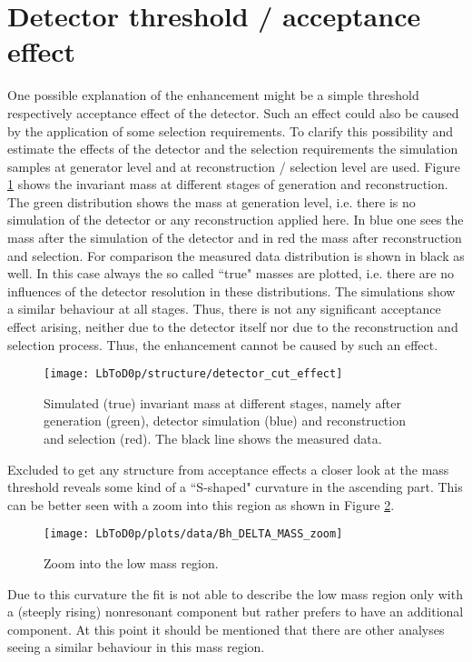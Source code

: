 \section{Detector threshold / acceptance effect}
One possible explanation of the enhancement might be a simple threshold respectively acceptance effect of the detector.
Such an effect could also be caused by the application of some selection requirements.
To clarify this possibility and estimate the effects of the detector and the selection requirements the simulation samples at generator level and at reconstruction / selection level are used.
Figure \ref{fig:detector_cut_effect} shows the invariant \Dz\proton mass at different stages of generation and reconstruction.
The green distribution shows the \Dz\proton mass at generation level, i.e. there is no simulation of the detector or any reconstruction applied here.
In blue one sees the \Dz\proton mass after the simulation of the detector and in red the mass after reconstruction and selection.
For comparison the measured data distribution is shown in black as well.
In this case always the so called ``true" masses are plotted, i.e. there are no influences of the detector resolution in these distributions.
The simulations show a similar behaviour at all stages.
Thus, there is not any significant acceptance effect arising, neither due to the detector itself nor due to the reconstruction and selection process. 
Thus, the enhancement cannot be caused by such an effect.
\begin{figure}[hptb]
	\centering
	\texttt{[image: LbToD0p/structure/detector\_cut\_effect]}
	\caption{Simulated (true) invariant \Dz\proton mass at different stages, namely after generation (green), detector simulation (blue) and reconstruction and selection (red). The black line shows the measured data.}
	\label{fig:detector_cut_effect}
\end{figure}

Excluded to get any structure from acceptance effects a closer look at the \Dz\proton mass threshold reveals some kind of a ``S-shaped" curvature in the ascending part.
This can be better seen with a zoom into this region as shown in Figure \ref{fig:mD0p_zoom}.
\begin{figure}[hptb]
	\centering
	\texttt{[image: LbToD0p/plots/data/Bh\_DELTA\_MASS\_zoom]}
	\caption{Zoom into the low \Dz\proton mass region.}
	\label{fig:mD0p_zoom}
\end{figure}

Due to this curvature the fit is not able to describe the low \Dz\proton mass region only with a (steeply rising) nonresonant component but rather prefers to have an additional component. 
At this point it should be mentioned that there are other analyses seeing a similar behaviour in this \Dz\proton mass region.

